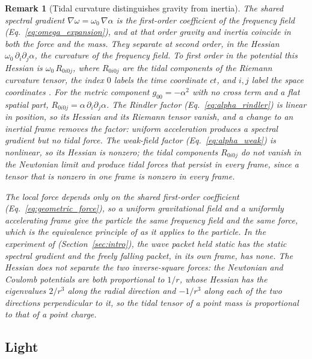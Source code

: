 \documentclass[aps,prd,onecolumn,tightenlines,nofootinbib,notitlepage,11pt,floatfix]{revtex4-2}
\theoremstyle{indentedtheorem}
\newtheorem{remark}{Remark}
\begin{document}
\begin{remark}[Tidal curvature distinguishes gravity from inertia]\label{rem:rank}
The shared spectral gradient $\nabla\omega=\omega_0 \, \nabla\alpha$ is the first-order coefficient of the frequency field (Eq.~\eqref{eq:omega_expansion}), and at that order gravity and inertia coincide in both the force and the mass. They separate at second order, in the Hessian $\omega_0\,\partial_i\partial_j\alpha$, the curvature of the frequency field. To first order in the potential this Hessian is $\omega_0\,R_{0i0j}$, where $R_{0i0j}$ are the tidal components of the Riemann curvature tensor, the index $0$ labels the time coordinate $ct$, and $i,j$ label the space coordinates \citep{MTW1973Gravitation}. For the metric component $g_{00}=-\alpha^2$ with no cross term and a flat spatial part, $R_{0i0j}=\alpha\,\partial_i\partial_j\alpha$. The Rindler factor (Eq.~\eqref{eq:alpha_rindler}) is linear in position, so its Hessian and its Riemann tensor vanish, and a change to an inertial frame removes the factor: uniform acceleration produces a spectral gradient but no tidal force. The weak-field factor (Eq.~\eqref{eq:alpha_weak}) is nonlinear, so its Hessian is nonzero; the tidal components $R_{0i0j}$ do not vanish in the Newtonian limit and produce tidal forces that persist in every frame, since a tensor that is nonzero in one frame is nonzero in every frame.

The local force depends only on the shared first-order coefficient (Eq.~\eqref{eq:geometric_force}), so a uniform gravitational field and a uniformly accelerating frame give the particle the same frequency field and the same force, which is the equivalence principle of \citet{Einstein1907Relativitatsprinzip} as it applies to the particle. In the experiment of \citet{Dobkowski2026Observation} (Section~\ref{sec:intro}), the wave packet held static has the static spectral gradient and the freely falling packet, in its own frame, has none. The Hessian does not separate the two inverse-square forces: the Newtonian and Coulomb potentials are both proportional to $1/r$, whose Hessian has the eigenvalues $2/r^3$ along the radial direction and $-1/r^3$ along each of the two directions perpendicular to it, so the tidal tensor of a point mass is proportional to that of a point charge.
\end{remark}

\subsection{Light}
\label{sec:light}
\end{document}
